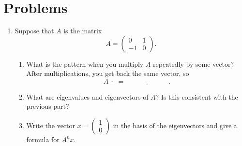 \documentclass[11pt]{article}
\begin{document}
\section{Problems}

\begin{enumerate}



%
%
%
%
%



\item Suppose that $A$ is the matrix
\[A = \begin{pmatrix} 0 & 1 \\ -1 & 0 \end{pmatrix}.\]


\begin{enumerate}

\item What is the pattern when you multiply $A$ repeatedly by some vector?  After \underline{\phantom{aaaaaaa}} multiplications, you get back the same vector, so 
\[A^{\underline{\phantom{aaa}}} = \underline{\phantom{aaaaaaaaaaaa}}.\]

\item What are eigenvalues and eigenvectors of $A$?  Is this consistent with the previous part?

\item Write the vector $x = \begin{pmatrix} 1 \\ 0 \end{pmatrix}$ in the basis of the eigenvectors and give a formula for $A^n x$.


\end{enumerate}
\end{enumerate}
\end{document}
